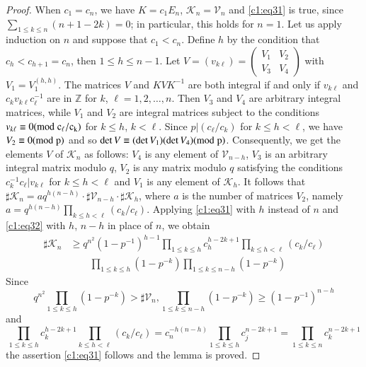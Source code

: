 \begin{proof}
When $c_{1}=c_{n}$, we have $K=c_{1}E_{n}$,
$\mathscr{K}_{n}=\mathscr{V}_{n}$ and \eqref{c1:eq31} is true, since
$\sum\limits_{1\leq k\leq n}(n+1-2k)=0$; in particular, this holds for
$n=1$. Let us apply induction on $n$ and suppose that
$c_{1}<c_{n}$. Define $h$ by the condition that $c_{h}<c_{h+1}=c_{n}$,
then $1\leq h\leq n-1$. Let $V=(v_{k\ell})=\left(\begin{smallmatrix}
  V_{1} & V_{2}\\ V_{3} & V_{4}\end{smallmatrix}\right)$ with
$V_{1}=V_{1}^{(h,h)}$. The matrices $V$ and $KVK^{-1}$ are both
integral if and only if $v_{k\ell}$ and $c_{k}v_{k\ell}c^{-1}_{\ell}$
are in $\mathbb{Z}$ for $k$, $\ell=1,2,\ldots,n$. Then $V_{3}$ and
$V_{4}$ are arbitrary integral matrices, while $V_{1}$ and $V_{2}$ are
integral matrices subject to the conditions $v_{k\ell}\equiv 0(\rm{mod} \;
c_{\ell}/c_{k})$ for $k\leq h$, $k<\ell$. Since $p|(c_{\ell}/c_{k})$
for $k\leq h<\ell$, we have $V_{2}\equiv 0(\rm{mod} \; p)$ and so $\det
V\equiv(\det V_{1})(\det V_{4})(\rm{mod} \; p)$. Consequently, we get the
elements $V$ of $\mathscr{K}_{n}$ as follows: $V_{4}$ is any element
of $\mathscr{V}_{n-h}$, $V_{3}$ is an arbitrary integral matrix modulo
$q$, $V_{2}$ is any matrix modulo $q$ satisfying the conditions
$c^{-1}_{k}c_{\ell}|v_{k\ell}$ for $k\leq h<\ell$ and $V_{1}$ is any
element of $\mathscr{K}_{h}$. It follows that $\sharp
\mathscr{K}_{n}=aq^{h(n-h)}\cdot \sharp\mathscr{V}_{n-h}\cdot \sharp
\mathscr{K}_{h}$, where $a$ is the number of matrices $V_{2}$, namely
$a=q^{h(n-h)}\prod\limits_{k\leq h<\ell}(c_{k}/c_{\ell})$. Applying
\eqref{c1:eq31} with $h$ instead of $n$ and \eqref{c1:eq32} with $h$, $n-h$
in place of $n$, we obtain
\begin{align*}
\sharp \mathscr{K}_{n}&\geq
q^{n^{2}}(1-p^{-1})^{h-1}\prod\limits_{1\leq k\leq
  h}c^{h-2k+1}_{h}\prod\limits_{k\leq
  h<\ell}(c_{k}/c_{\ell})\\
&\qquad\prod\limits_{1\leq k\leq
  h}(1-p^{-k})\prod\limits_{1\leq k\leq n-h}(1-p^{-k})
\end{align*}
Since\pageoriginale
$$
q^{n^{2}}\prod_{1\leq k\leq h}(1-p^{-k})>\sharp
\mathscr{V}_{n},\prod_{1\leq k\leq n-h} (1-p^{-k})\geq
(1-p^{-1})^{n-h}
$$
and
$$
\prod_{1\leq k\leq h}c^{h-2k+1}_{k}\prod_{k\leq
  h<\ell}(c_{k}/c_{\ell})=c^{-h(n-h)}_{n}\prod_{1\leq k\leq
  h}c^{n-2k+1}_{j}=\prod_{1\leq k\leq n}c^{n-2k+1}_{k}
$$
the assertion \eqref{c1:eq31} follows and the lemma is proved.
\end{proof}

